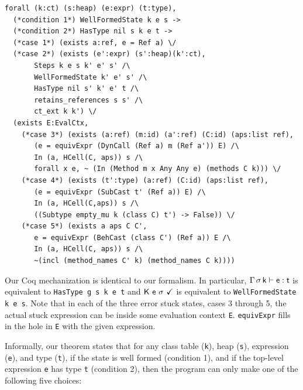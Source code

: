 \documentclass[acmsmall, anonymous, authordraft, review]{acmart} %
\begin{document}
\begin{lstlisting}[basicstyle=\ttfamily\footnotesize, language={}, 
morekeywords={forall, exists}, keywordstyle={\ttfamily\color{blue!80}}, escapeinside={}]
forall (k:ct) (s:heap) (e:expr) (t:type),
  (*condition 1*) WellFormedState k e s -> 
  (*condition 2*) HasType nil s k e t -> 
  (*case 1*) (exists a:ref, e = Ref a) \/
  (*case 2*) (exists (e':expr) (s':heap)(k':ct), 
       Steps k e s k' e' s' /\
       WellFormedState k' e' s' /\
       HasType nil s' k' e' t /\
       retains_references s s' /\
       ct_ext k k') \/
  (exists E:EvalCtx,
    (*case 3*) (exists (a:ref) (m:id) (a':ref) (C:id) (aps:list ref),
       (e = equivExpr (DynCall (Ref a) m (Ref a')) E) /\
       In (a, HCell(C, aps)) s /\
       forall x e, ~ (In (Method m x Any Any e) (methods C k))) \/
    (*case 4*) (exists (t':type) (a:ref) (C:id) (aps:list ref),
       (e = equivExpr (SubCast t' (Ref a)) E) /\
       In (a, HCell(C,aps)) s /\
       ((Subtype empty_mu k (class C) t') -> False)) \/
    (*case 5*) (exists a aps C C', 
       e = equivExpr (BehCast (class C') (Ref a)) E /\
       In (a, HCell(C, aps)) s /\
       ~(incl (method_names C' k) (method_names C k))))
\end{lstlisting}

Our Coq mechanization is identical to our formalism. In particular,
$\EnvType\Env\s\k\e\t$ is equivalent to \verb|HasType g s k e t| and
$\WFq{\K~\e~\s}$ is equivalent to \verb|WellFormedState k e s|. Note that in
each of the three error stuck states, cases 3 through 5, the actual stuck
expression can be inside some evaluation context \verb|E|. \verb|equivExpr|
fills in the hole in \verb|E| with the given expression.

Informally, our theorem states that for any class table (\verb|k|), heap
(\verb|s|), expression (\verb|e|), and type (\verb|t|), if the state is well
formed (condition 1), and if the top-level expression \verb|e| has type
\verb|t| (condition 2), then the program can only make one of the following
five choices:
\end{document}
